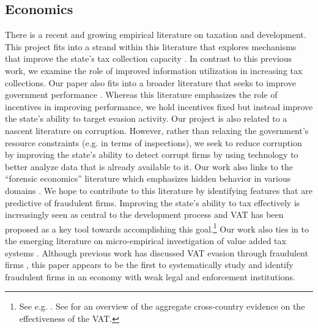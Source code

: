 \subsection{Economics}
\label{subsec:literature-economics}
There is a recent and growing empirical literature on taxation and development. This project fits into a strand within this literature
that explores mechanisms that improve the state's tax collection capacity \cite{khan2016tax}. In contrast to this previous work, we
examine the role of improved information utilization in increasing tax collections. Our paper also fits into a broader literature that seeks to improve government performance \cite{muralidharan2011teacher, glewwe2010teacher}. Whereas this literature emphasizes the role of incentives in improving performance, we hold incentives fixed but instead improve the state's ability to target evasion activity. Our project is also related to a nascent literature on corruption\cite{olken2012corruption, duflo2013truth}. However, rather than relaxing the government's resource constraints (e.g. in terms of inspections), we seek to reduce corruption by improving the state's ability to detect corrupt firms by using technology to better analyze data that is already available to it. Our work also links to the ``forensic economics'' literature which emphasizes hidden behavior in various domains \cite{zitzewitz2012forensic, jacob2003rotten, mironov2014corruption}. We hope to contribute to this literature by identifying features that are predictive of fraudulent firms. Improving the state's ability to tax effectively is increasingly seen as central to the development process and VAT has been proposed as a key tool towards accomplishing this goal.\footnote{See e.g. \cite{besley2013taxation}. See  \cite{Ebrilletal:2001} for an overview of the aggregate cross-country evidence on the effectiveness of the VAT.} Our work also ties in to the emerging literature on micro-empirical investigation of value added tax systems \cite{almunia2015under, mittal2017vat, naritomi2013consumers, pomeranz2015no}.  Although previous work has discussed VAT evasion through fraudulent firms \cite{keen2006vat, pashev2007countering}, this paper appears to be the first to systematically study and identify fraudulent firms in an economy with weak legal and enforcement institutions.

